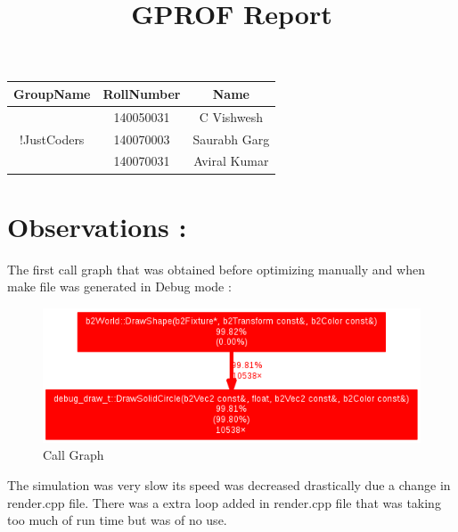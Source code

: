 \documentclass[12pt,a4paper]{article}
\begin{document}
\title{\color{red} GPROF Report}
\maketitle

\begin{table}[ph]
\large
\centering
\begin{tabular}{c c c}
\hline
GroupName &RollNumber &Name\\
\hline 
\multirow{3}{*}{!JustCoders} &140050031 &C Vishwesh\\ &140070003 &Saurabh Garg\\&140070031 &Aviral Kumar\\
\hline
\end{tabular}
\end{table}
\pagebreak

\section*{Observations :}

The first call graph that was obtained before optimizing manually and when make file was generated in Debug mode :
\begin{figure}[ht!]
\centering
\includegraphics[scale=0.75]{./debugVersion_before.png}
\caption{Call Graph}
\end{figure} 

The simulation was very slow its speed was decreased drastically due a change in render.cpp file. There was a extra loop added in render.cpp file that was taking too much of run time but was of no use. 
\\
\end{document}
